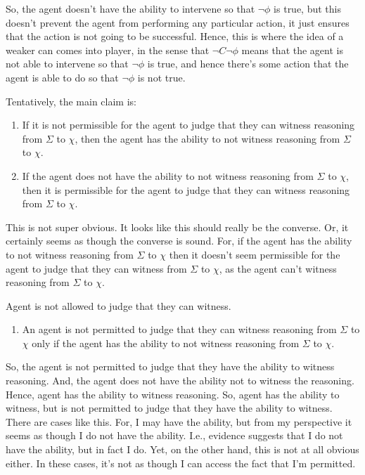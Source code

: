 \documentclass[10pt]{article}
\begin{document}
So, the agent doesn't have the ability to intervene so that \(\lnot\phi\) is true, but this doesn't prevent the agent from performing any particular action, it just ensures that the action is not going to be successful.
Hence, this is where the idea of a weaker can comes into player, in the sense that \(\lnot C \lnot\phi\) means that the agent is not able to intervene so that \(\lnot\phi\) is true, and hence there's some action that the agent is able to do so that \(\lnot\phi\) is not true.


\newpage

Tentatively, the main claim is:

\begin{enumerate}
\item If it is not permissible for the agent to judge that they can witness reasoning from \(\Sigma\) to \(\chi\), then the agent has the ability to not witness reasoning from \(\Sigma\) to \(\chi\).
\item If the agent does not have the ability to not witness reasoning from \(\Sigma\) to \(\chi\), then it is permissible for the agent to judge that they can witness reasoning from \(\Sigma\) to \(\chi\).
\end{enumerate}

This is not super obvious.
It looks like this should really be the converse.
Or, it certainly seems as though the converse is sound.
For, if the agent has the ability to not witness reasoning from \(\Sigma\) to \(\chi\) then it doesn't seem permissible for the agent to judge that they can witness from \(\Sigma\) to \(\chi\), as the agent can't witness reasoning from \(\Sigma\) to \(\chi\).

Agent is not allowed to judge that they can witness.

\begin{enumerate}
\item An agent is not permitted to judge that they can witness reasoning from \(\Sigma\) to \(\chi\) only if the agent has the ability to not witness reasoning from \(\Sigma\) to \(\chi\).
\end{enumerate}

So, the agent is not permitted to judge that they have the ability to witness reasoning.
And, the agent does not have the ability not to witness the reasoning.
Hence, agent has the ability to witness reasoning.
So, agent has the ability to witness, but is not permitted to judge that they have the ability to witness.
There are cases like this.
For, I may have the ability, but from my perspective it seems as though I do not have the ability.
I.e., evidence suggests that I do not have the ability, but in fact I do.
Yet, on the other hand, this is not at all obvious either.
In these cases, it's not as though I can access the fact that I'm permitted.
\end{document}
